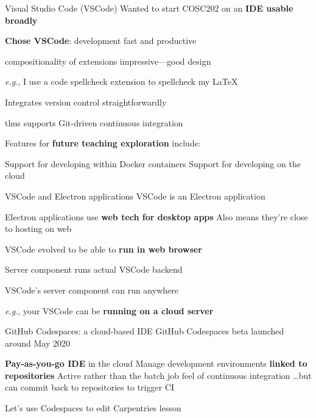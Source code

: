 \documentclass[aspectratio=169,t]{beamer}
\begin{document}
\begin{dframe}{Visual Studio Code (VSCode)}
  \1 Wanted to start COSC202 on an \textbf{IDE usable broadly}

  \smallskip

  \1 \textbf{Chose VSCode}: development fast and productive
  
  \2 compositionality of extensions impressive---good design
  
  \3 \emph{e.g.}, I use a code spellcheck extension to spellcheck my \LaTeX{}

  \2 Integrates version control straightforwardly
  
  \3 thus supports Git-driven continuous integration

  \smallskip

  \1 Features for \textbf{future teaching exploration} include:

  \2 Support for developing within Docker containers
  \2 Support for developing on the cloud
\end{dframe}

\begin{dframe}{VSCode and Electron applications}
  \1 VSCode is an Electron application

  \2 Electron applications use \textbf{web tech for desktop apps}
  \2 Also means they're close to hosting on web

  \bigskip

  \1 VSCode evolved to be able to \textbf{run in web browser}

  \2 Server component runs actual VSCode backend
    
  \bigskip

  \1 VSCode's server component can run anywhere

  \2 \emph{e.g.}, your VSCode can be \textbf{running on a cloud server}

\end{dframe}

\begin{dframe}{GitHub Codespaces: a cloud-based IDE}
  \1 GitHub Codespaces beta launched around May 2020

  \2 \textbf{Pay-as-you-go IDE} in the cloud
  \2 Manage development environments \textbf{linked to repositories}
  \2 Active rather than the batch job feel of continuous integration
  \2 \dots but can commit back to repositories to trigger CI

  \bigskip

  \1 Let's use Codespaces to edit Carpentries lesson
\end{dframe}
\end{document}
